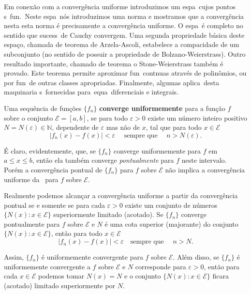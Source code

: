 Em conexão  com a converg\^encia uniforme introduzimos um espa\co\
cujos pontos s\ao\ fun\coes.\ Neste espa\co\ n\'os introduzimos
uma norma e mostramos  que a converg\^encia nesta esta norma \'e
precisamente a converg\^encia uniforme. O espa\co\ é completo no
sentido que sucess\oes\ de Cauchy convergem. Uma segunda
propriedade b\'asica deste espaço, chamada de teorema de
Arzela-Ascoli, estabelece a compacidade de um subconjunto (no
sentido de possuir a propriedade de Bolzano-Weierstrass). Outro
resultado importante, chamado de teorema o Stone-Weierstrass
também é provado. Este teorema permite  aproximar fun\coes\
cont\ii nuas através de polin\^omios, ou por fun\coes\ de outras
classes apropriadas. Finalmente, algumas aplica\coes\ desta
maquinaria s\ao\ fornecidas para\ equa\coes\  diferenciais e
integrais.

\begin{defic}{}{} Uma sequência de funções $\{f_n\}$ \textbf{converge
uniformemente} para a função $f$ sobre o conjunto $\mathcal{E}=[a,
b]$, se para todo $\varepsilon > 0$ existe um número inteiro positivo
$N= N(\varepsilon) \in \mathbb{N}$, dependente de $\varepsilon$ mas não 
de $x$, tal que para todo $x\in \mathcal{E}$
\begin{equation*}
  |f_n(x) - f(x)|< \varepsilon\quad \text{ sempre que }\quad  n>
  N(\varepsilon).
\end{equation*}
\end{defic}

É claro, evidentemente, que, se $\{f_n\}$ converge uniformemente
para $f$ em $a\leq x\leq b$, então ela também converge
\textit{pontualmente} para $f$ neste intervalo. Porém a
convergência pontual de $\{f_n\}$ para $f$ sobre $\mathcal{E}$ não
implica a convergência uniforme da \seq\ para $f$ sobre
$\mathcal{E}$.

Realmente podemos alcançar a convergência uniforme
a partir da convergência pontual se e somente se para cada
$\varepsilon>0$ existe um conjunto de números $\{N(x)\colon x\in
\mathcal{E}\}$ superiormente limitado (acotado). Se $\{f_n\}$ converge
pontualmente para $f$ sobre $\mathcal{E}$ e $N$ é uma cota
superior (majorante) do conjunto $\{N(x)\colon x\in \mathcal{E}\}$, então para
todo $x\in \mathcal{E}$
\begin{equation*}
    |f_n(x)-f(x)|<\varepsilon\quad\text{sempre que }\quad n>N.
\end{equation*}

Assim, $\{f_n\}$ é uniformemente convergente para $f$ sobre
$\mathcal{E}$. Além disso, se $\{f_n\}$ é uniformemente
convergente a $f$ sobre $\mathcal{E}$ e $N$ corresponde para
$\varepsilon>0$, então para cada $x\in \mathcal{E}$ podemos tomar
$N(x)=N$ e o conjunto $\{N(x)\colon x\in \mathcal{E}\}$ ficara
(acotado) limitado superiormente por $N$.

